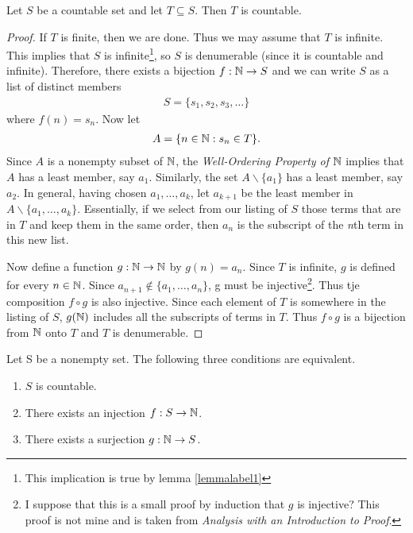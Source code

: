 \begin{theorem}
	\label{theolabel3}
	Let $S$ be a countable set and let $T\subseteq S$. Then $T$ is countable.
\end{theorem}

\begin{proof}
	If $T$ is finite, then we are done. Thus we may assume that $T$ is infinite. This implies that $S$ is infinite\footnote{This implication is true by lemma \ref{lemmalabel1}}, so $S$ is denumerable (since it is countable and infinite). Therefore, there exists a bijection $f:\mathbb{N}\rightarrow S$ and we can write $S$ as a list of distinct members
	\begin{align*}
		S=\{s_1,s_2,s_3,\hdots\}
	\end{align*}
	where $f(n)=s_n$. Now let
	\begin{align*}
		A=\{n\in\mathbb{N}:s_n\in T\}.
	\end{align*}
	Since $A$ is a nonempty subset of $\mathbb{N}$, the \textit{Well-Ordering Property of $\mathbb{N}$} implies that $A$ has a least member, say $a_1$. Similarly, the set $A\backslash \{a_1\}$ has a least member, say $a_2$. In general, having chosen $a_1,\hdots,a_k$, let $a_{k+1}$ be the least member in $A\backslash \{a_1,\hdots,a_k\}$. Essentially, if we select from our listing of $S$ those terms that are in $T$ and keep them in the same order, then $a_n$ is the subscript of the \textit{n}th term in this new list.
	
	Now define a function $g:\mathbb{N}\rightarrow\mathbb{N}$ by $g(n)=a_n$. Since $T$ is infinite, $g$ is defined for every $n\in\mathbb{N}$. Since $a_{n+1}\notin \{a_1,\hdots,a_n\}$, g must be injective\footnote{I suppose that this is a small proof by induction that $g$ is injective? This proof is not mine and is taken from \textit{Analysis with an Introduction to Proof}.}. Thus tje composition $f\circ g$ is also injective. Since each element of $T$ is somewhere in the listing of $S$, $g(\mathbb{N})$ includes all the subscripts of terms in $T$. Thus $f\circ g$ is a bijection from $\mathbb{N}$ onto $T$ and $T$ is denumerable.
\end{proof}

\begin{theorem}
	Let S be a nonempty set. The following three conditions are equivalent.
	\begin{enumerate}
		\item $S$ is countable.
		\item There exists an injection $f:S\rightarrow \mathbb{N}$.
		\item There exists a surjection $g:\mathbb{N}\rightarrow S$.
	\end{enumerate}
\end{theorem}

